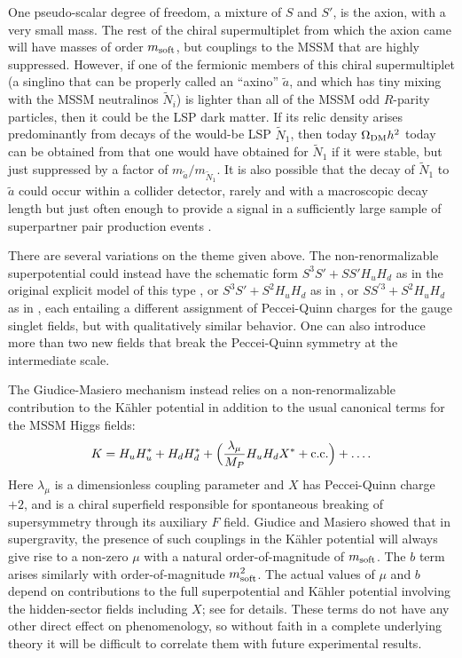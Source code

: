 \documentclass[12pt]{article}
\def\beq{\begin{eqnarray}}
\def\eeq{\end{eqnarray}}
\begin{document}
One pseudo-scalar degree of freedom, a mixture of $S$ and $S'$,
is the axion, with a very small mass. The rest of the chiral
supermultiplet from which the axion came will have masses of order
$m_{\rm soft}$, but couplings to the MSSM that are highly suppressed.
However, if one of the fermionic members of this chiral supermultiplet
(a singlino that can be properly called an ``axino'' $\tilde a$, and
which has tiny mixing with the MSSM neutralinos $\tilde N_i$) is lighter
than all of the MSSM odd $R$-parity particles,
then it could be the LSP dark matter. If its relic density 
arises predominantly from decays of the would-be LSP $\tilde N_1$, then today 
$\Omega_{\rm DM} h^2$ today can be obtained from that one would have obtained for $\tilde 
N_1$ if it were stable, but just
suppressed by a factor of $m_{\tilde a}/m_{\tilde N_1}$. It is
also possible that the decay of $\tilde N_1$ to $\tilde a$ could occur
within a collider detector, rarely and with a macroscopic decay length but
just often enough to provide a signal in a sufficiently large sample of
superpartner pair production events \cite{Martinaxinos}.

There are several variations on the theme given above.
The non-renormalizable superpotential could instead
have the schematic form
$S^3 S' + S S' H_u H_d$
as in the original explicit model of this type
\cite{MurayamaSuzukiYanagida}, or
$S^3 S' + S^2 H_u H_d$
as in \cite{ChoiChunKim},
or $S S^{\prime 3} + S^2 H_u H_d$ as in \cite{Martinaxinos},
each entailing a different assignment
of Peccei-Quinn charges for the gauge singlet fields, 
but with qualitatively similar behavior.
One can also introduce more than two new fields that break the
Peccei-Quinn symmetry at the intermediate scale.

The Giudice-Masiero mechanism instead relies on 
a non-renormalizable contribution to the
K\"ahler potential in addition to the usual 
canonical terms for the MSSM Higgs fields:
\beq
K = H_u H_u^* + H_d H_d^* + \Bigl (\frac{\lambda_\mu}{M_P} H_u H_d X^* +
{\rm c.c.} \Bigr ) + \ldots. \label{eq:KahlerpotentialforGiudiceMasiero}
\eeq
Here $\lambda_\mu$ is a dimensionless coupling parameter and 
$X$ has Peccei-Quinn charge $+2$, and is a chiral superfield responsible for
spontaneous breaking of supersymmetry through its auxiliary $F$ field.
Giudice and Masiero showed
\cite{GiudiceMasiero} that in supergravity, the presence of such
couplings in the K\"ahler potential
will always give rise to a non-zero $\mu$ with a natural
order-of-magnitude of $m_{\rm soft}$. The $b$ term arises
similarly with order-of-magnitude $m_{\rm soft}^2$. The actual values of
$\mu$ and $b$ depend on contributions to the full superpotential and K\"ahler potential
involving the hidden-sector fields including $X$; see
\cite{GiudiceMasiero} for details. These terms do
not have any other direct effect on phenomenology, so without faith in a
complete underlying theory it will be difficult to correlate them with future
experimental results.
\end{document}
